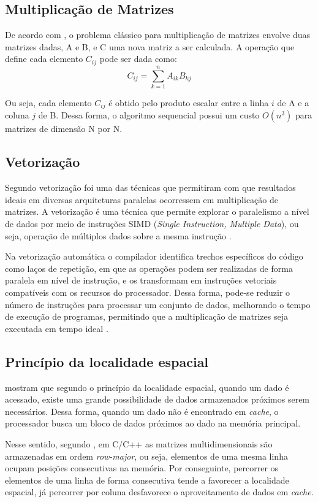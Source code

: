 \documentclass[12pt]{article}
\begin{document}
\subsection{Multiplicação de Matrizes}
De acordo com \cite{cormen2012}, o problema clássico para multiplicação de matrizes envolve duas matrizes dadas, A e B, e C uma nova matriz a ser calculada. A operação que define cada elemento $C_{ij}$ pode ser dada como:
\begin{equation}
C_{ij} = \sum_{k=1}^{n} A_{ik}B_{kj}
\end{equation}
\par
Ou seja, cada elemento $C_{ij}$ é obtido pelo produto escalar entre a linha $i$
de A e a coluna $j$ de B. Dessa forma, o algoritmo sequencial possui um custo $O(n^3)$ para matrizes de dimensão N por N. 
\subsection{Vetorização}
Segundo \cite{allen2002} vetorização foi uma das técnicas que permitiram com que resultados ideais em diversas arquiteturas paralelas ocorressem em multiplicação de matrizes. A vetorização é uma técnica que permite explorar o paralelismo a nível de dados por meio de instruções SIMD (\textit{Single Instruction, Multiple Data}), ou seja, operação de múltiplos dados sobre a mesma instrução \cite{hennessy2017}. 
\par
Na vetorização automática o compilador identifica trechos específicos do código como laços de repetição, em que as operações podem ser realizadas de forma paralela em nível de instrução, e os transformam em instruções vetoriais compatíveis com os recursos do processador. Dessa forma, pode-se reduzir o número de instruções para processar um conjunto de dados, melhorando o tempo de execução de programas, permitindo que a multiplicação de matrizes seja executada em tempo ideal \cite{intel2023vectorization}. 

\subsection{Princípio da localidade espacial}
\cite{hennessy2017} mostram que segundo o princípio da localidade espacial, quando um dado é acessado, existe uma grande possibilidade de dados armazenados próximos serem necessários. Dessa forma, quando um dado não é encontrado em \textit{cache}, o processador busca um bloco de dados próximos ao dado na memória principal.
\par
Nesse sentido, segundo \cite{cppreference_array}, em C/C++ as matrizes multidimensionais são armazenadas em ordem \textit{row-major}, ou seja, elementos de uma mesma linha ocupam posições consecutivas na memória. Por conseguinte, percorrer os elementos de uma linha de forma consecutiva tende a favorecer a localidade espacial, já percorrer por coluna desfavorece o aproveitamento de dados em \textit{cache}.
\end{document}
